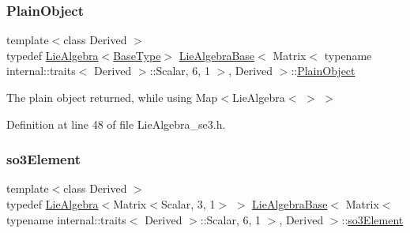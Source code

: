 \subsubsection{\texorpdfstring{Plain\+Object}{PlainObject}}
{\footnotesize\ttfamily template$<$class Derived $>$ \\
typedef \hyperlink{class_lie_algebra}{Lie\+Algebra}$<$\hyperlink{class_lie_algebra_base_3_01_matrix_3_01typename_01internal_1_1traits_3_01_derived_01_4_1_1_scala449314c781550590437697c4dc21a6d4_abb811fe29a9ece0ee6f2239f17fea23f}{Base\+Type}$>$ \hyperlink{class_lie_algebra_base}{Lie\+Algebra\+Base}$<$ Matrix$<$ typename internal\+::traits$<$ Derived $>$\+::Scalar, 6, 1 $>$, Derived $>$\+::\hyperlink{class_lie_algebra_base_3_01_matrix_3_01typename_01internal_1_1traits_3_01_derived_01_4_1_1_scala449314c781550590437697c4dc21a6d4_a7ce4eac189e072d4fddf555084b3d94f}{Plain\+Object}}

The plain object returned, while using Map$<$Lie\+Algebra$<$ $>$ $>$ 

Definition at line 48 of file Lie\+Algebra\+\_\+se3.\+h.

\hypertarget{class_lie_algebra_base_3_01_matrix_3_01typename_01internal_1_1traits_3_01_derived_01_4_1_1_scala449314c781550590437697c4dc21a6d4_aee714752364bcba43e97f130091fcc6e}{}\label{class_lie_algebra_base_3_01_matrix_3_01typename_01internal_1_1traits_3_01_derived_01_4_1_1_scala449314c781550590437697c4dc21a6d4_aee714752364bcba43e97f130091fcc6e} 
\subsubsection{\texorpdfstring{so3\+Element}{so3Element}}
{\footnotesize\ttfamily template$<$class Derived $>$ \\
typedef \hyperlink{class_lie_algebra}{Lie\+Algebra}$<$Matrix$<$Scalar, 3, 1$>$ $>$ \hyperlink{class_lie_algebra_base}{Lie\+Algebra\+Base}$<$ Matrix$<$ typename internal\+::traits$<$ Derived $>$\+::Scalar, 6, 1 $>$, Derived $>$\+::\hyperlink{class_lie_algebra_base_3_01_matrix_3_01typename_01internal_1_1traits_3_01_derived_01_4_1_1_scala449314c781550590437697c4dc21a6d4_aee714752364bcba43e97f130091fcc6e}{so3\+Element}}


